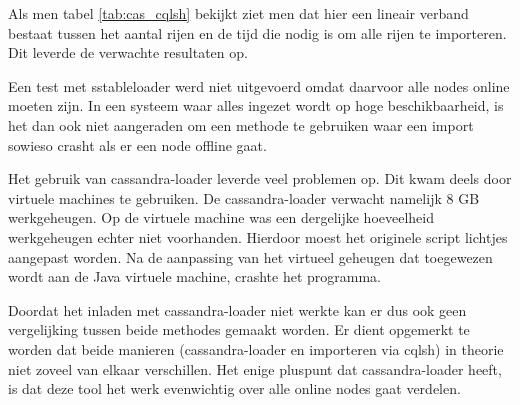 Als men tabel \ref{tab:cas_cqlsh} bekijkt ziet men dat hier een lineair verband bestaat tussen het aantal rijen en de tijd die nodig is om alle rijen te importeren.
Dit leverde de verwachte resultaten op.

Een test met sstableloader werd niet uitgevoerd omdat daarvoor alle nodes online moeten zijn.
In een systeem waar alles ingezet wordt op hoge beschikbaarheid, is het dan ook niet aangeraden om een methode te gebruiken waar een import sowieso crasht als er een node offline gaat.

Het gebruik van cassandra-loader leverde veel problemen op.
Dit kwam deels door virtuele machines te gebruiken.
De cassandra-loader verwacht namelijk 8 GB werkgeheugen.
Op de virtuele machine was een dergelijke hoeveelheid werkgeheugen echter niet voorhanden.
Hierdoor moest het originele script lichtjes aangepast worden.
Na de aanpassing van het virtueel geheugen dat toegewezen wordt aan de Java virtuele machine, crashte het programma.

Doordat het inladen met cassandra-loader niet werkte kan er dus ook geen vergelijking tussen beide methodes gemaakt worden.
Er dient opgemerkt te worden dat beide manieren (cassandra-loader en importeren via cqlsh) in theorie niet zoveel van elkaar verschillen.
Het enige pluspunt dat cassandra-loader heeft, is dat deze tool het werk evenwichtig over alle online nodes gaat verdelen.